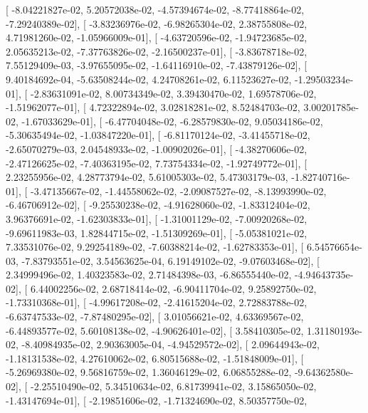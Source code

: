 \documentclass{article}
\begin{document}
       [ -8.04221827e-02,   5.20572038e-02,  -4.57394674e-02,
         -8.77418864e-02,  -7.29240389e-02],
       [ -3.83236976e-02,  -6.98265304e-02,   2.38755808e-02,
          4.71981260e-02,  -1.05966009e-01],
       [ -4.63720596e-02,  -1.94723685e-02,   2.05635213e-02,
         -7.37763826e-02,  -2.16500237e-01],
       [ -3.83678718e-02,   7.55129409e-03,  -3.97655095e-02,
         -1.64116910e-02,  -7.43879126e-02],
       [  9.40184692e-04,  -5.63508244e-02,   4.24708261e-02,
          6.11523627e-02,  -1.29503234e-01],
       [ -2.83631091e-02,   8.00734349e-02,   3.39430470e-02,
          1.69578706e-02,  -1.51962077e-01],
       [  4.72322894e-02,   3.02818281e-02,   8.52484703e-02,
          3.00201785e-02,  -1.67033629e-01],
       [ -6.47704048e-02,  -6.28579830e-02,   9.05034186e-02,
         -5.30635494e-02,  -1.03847220e-01],
       [ -6.81170124e-02,  -3.41455718e-02,  -2.65070279e-03,
          2.04548933e-02,  -1.00902026e-01],
       [ -4.38270606e-02,  -2.47126625e-02,  -7.40363195e-02,
          7.73754334e-02,  -1.92749772e-01],
       [  2.23255956e-02,   4.28773794e-02,   5.61005303e-02,
          5.47303179e-03,  -1.82740716e-01],
       [ -3.47135667e-02,  -1.44558062e-02,  -2.09087527e-02,
         -8.13993990e-02,  -6.46706912e-02],
       [ -9.25530238e-02,  -4.91628060e-02,  -1.83312404e-02,
          3.96376691e-02,  -1.62303833e-01],
       [ -1.31001129e-02,  -7.00920268e-02,  -9.69611983e-03,
          1.82844715e-02,  -1.51309269e-01],
       [ -5.05381021e-02,   7.33531076e-02,   9.29254189e-02,
         -7.60388214e-02,  -1.62783353e-01],
       [  6.54576654e-03,  -7.83793551e-02,   3.54563625e-04,
          6.19149102e-02,  -9.07603468e-02],
       [  2.34999496e-02,   1.40323583e-02,   2.71484398e-03,
         -6.86555440e-02,  -4.94643735e-02],
       [  6.44002256e-02,   2.68718414e-02,  -6.90411704e-02,
          9.25892750e-02,  -1.73310368e-01],
       [ -4.99617208e-02,  -2.41615204e-02,   2.72883788e-02,
         -6.63747533e-02,  -7.87480295e-02],
       [  3.01056621e-02,   4.63369567e-02,  -6.44893577e-02,
          5.60108138e-02,  -4.90626401e-02],
       [  3.58410305e-02,   1.31180193e-02,  -8.40984935e-02,
          2.90363005e-04,  -4.94529572e-02],
       [  2.09644943e-02,  -1.18131538e-02,   4.27610062e-02,
          6.80515688e-02,  -1.51848009e-01],
       [ -5.26969380e-02,   9.56816759e-02,   1.36046129e-02,
          6.06855288e-02,  -9.64362580e-02],
       [ -2.25510490e-02,   5.34510634e-02,   6.81739941e-02,
          3.15865050e-02,  -1.43147694e-01],
       [ -2.19851606e-02,  -1.71324690e-02,   8.50357750e-02,
\end{document}
